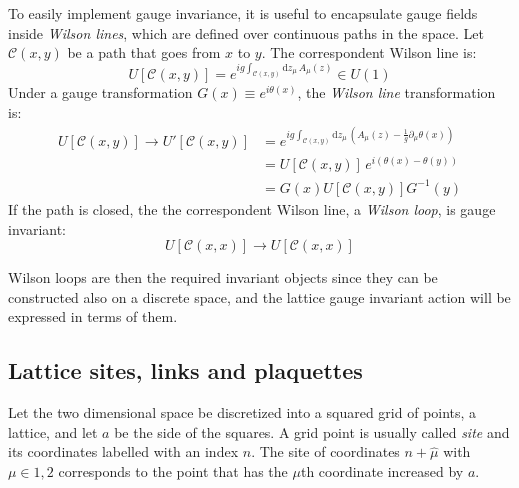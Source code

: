To easily implement gauge invariance, it is useful to encapsulate gauge fields inside \emph{Wilson lines}, which are defined over continuous paths in the space.
Let $\mathcal C(x,y)$ be a path that goes from $x$ to $y$. The correspondent Wilson line is:
\[
    U[\mathcal C(x,y)] = e^{ig\int_{\mathcal C(x,y)}\mathrm dz_\mu\,A_\mu(z)} \in U(1)
\]
Under a gauge transformation $G(x) \equiv e^{i\theta(x)}$, the \emph{Wilson line} transformation is:
\begin{equation}\label{eq:path_gauge}
    \begin{aligned}
    U[\mathcal C(x,y)] \rightarrow U'[\mathcal C(x,y)] &= e^{ig\int_{\mathcal C(x,y)}\mathrm dz_\mu\,\left(A_\mu(z) - \frac{1}{g}\partial_\mu\theta(x)\right)} \\
                                                       &= U[\mathcal C(x,y)]\,e^{i(\theta(x) - \theta(y))} \\
                                                       &= G(x)U[\mathcal C(x,y)]G^{-1}(y)
    \end{aligned}
\end{equation}
If the path is closed, the the correspondent Wilson line, \ie a \emph{Wilson loop}, is gauge invariant:
\[
    U[\mathcal C(x,x)] \rightarrow U[\mathcal C(x,x)]
\]

Wilson loops are then the required invariant objects since they can be constructed also on a discrete space,
and the lattice gauge invariant action will be expressed in terms of them.

\subsection*{Lattice sites, links and plaquettes}
Let the two dimensional space be discretized into a squared grid of points, \ie a lattice, and let $a$ be the side of the squares.
A grid point is usually called \emph{site} and its coordinates labelled with an index $n$.
The site of coordinates $n + \hat\mu$ with $\mu \in {1,2}$ corresponds to the point that has the $\mu$th coordinate increased by $a$.

